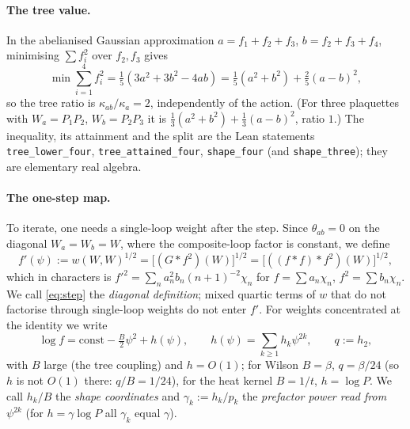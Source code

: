 \documentclass[11pt,a4paper]{article}
\theoremstyle{definition}
\theoremstyle{remark}
\newcommand{\code}[1]{\texttt{#1}}
\begin{document}
\paragraph{The tree value.}
In the abelianised Gaussian approximation $a=f_1+f_2+f_3$, $b=f_2+f_3+f_4$, minimising $\sum f_i^2$ over $f_2,f_3$ gives
\begin{equation}\label{eq:tree}
\min\sum_{i=1}^4 f_i^2=\tfrac15(3a^2+3b^2-4ab)=\tfrac15(a^2+b^2)+\tfrac25(a-b)^2 ,
\end{equation}
so the tree ratio is $\kappa_{ab}/\kappa_a=2$, independently of the action.
(For three plaquettes with $W_a=P_1P_2$, $W_b=P_2P_3$ it is $\tfrac13(a^2+b^2)+\tfrac13(a-b)^2$, ratio $1$.)
The inequality, its attainment and the split are the Lean statements \code{tree\_lower\_four}, \code{tree\_attained\_four}, \code{shape\_four} (and \code{shape\_three}); they are elementary real algebra.

\paragraph{The one-step map.}
To iterate, one needs a single-loop weight after the step.
Since $\theta_{ab}=0$ on the diagonal $W_a=W_b=W$, where the composite-loop factor is constant, we define
\begin{equation}\label{eq:step}
f'(\psi):=w(W,W)^{1/2}=\bigl[(G*f^2)(W)\bigr]^{1/2}=\bigl[((f*f)*f^2)(W)\bigr]^{1/2},
\end{equation}
which in characters is $f'^2=\sum_n a_n^2b_n(n+1)^{-2}\chi_n$ for $f=\sum a_n\chi_n$, $f^2=\sum b_n\chi_n$.
We call \eqref{eq:step} the \emph{diagonal definition}; mixed quartic terms of $w$ that do not factorise through single-loop weights do not enter $f'$.
For weights concentrated at the identity we write
\begin{equation}\label{eq:class}
\log f=\mathrm{const}-\tfrac{B}{2}\psi^2+h(\psi),\qquad h(\psi)=\sum_{k\ge1}h_k\psi^{2k},\qquad q:=h_2,
\end{equation}
with $B$ large (the tree coupling) and $h=O(1)$; for Wilson $B=\beta$, $q=\beta/24$ (so $h$ is not $O(1)$ there: $q/B=1/24$), for the heat kernel $B=1/t$, $h=\log P$.
We call $h_k/B$ the \emph{shape coordinates} and $\gamma_k:=h_k/p_k$ the \emph{prefactor power read from $\psi^{2k}$} (for $h=\gamma\log P$ all $\gamma_k$ equal $\gamma$).
\end{document}
